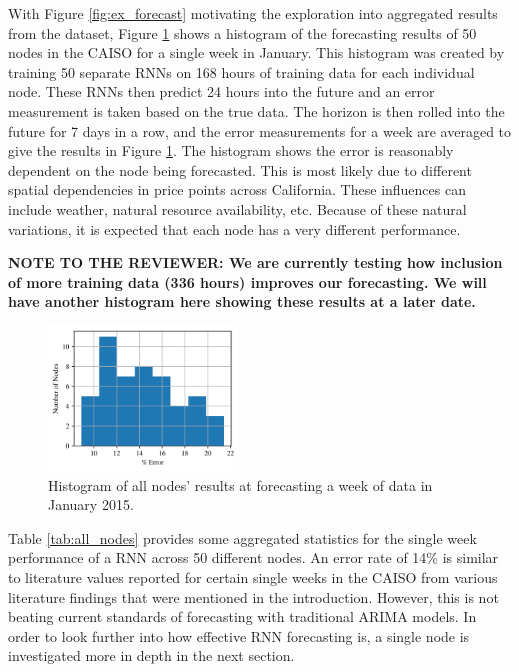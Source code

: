 \documentclass[sigconf]{acmart}
\begin{document}
With Figure \ref{fig:ex_forecast} motivating the exploration into aggregated results from the dataset, Figure \ref{fig:hist_small} shows a histogram of the forecasting results of 50 nodes in the CAISO for a single week in January. This histogram was created by training 50 separate RNNs on 168 hours of training data for each individual node. These RNNs then predict 24 hours into the future and an error measurement is taken based on the true data. The horizon is then rolled into the future for 7 days in a row, and the error measurements for a week are averaged to give the results in Figure \ref{fig:hist_small}. The histogram shows the error is reasonably dependent on the node being forecasted. This is most likely due to different spatial dependencies in price points across California. These influences can include weather, natural resource availability, etc. Because of these natural variations, it is expected that each node has a very different performance. 

\textbf{NOTE TO THE REVIEWER: We are currently testing how inclusion of more training data (336 hours) improves our forecasting. We will have another histogram here showing these results at a later date.}

\begin{figure}[h]
\includegraphics[width=0.45\textwidth]{fig_5.png}
\caption{Histogram of all nodes' results at forecasting a week of data in January 2015.}
\label{fig:hist_small}
\end{figure}



Table \ref{tab:all_nodes} provides some aggregated statistics for the single week performance of a RNN across 50 different nodes. An error rate of 14\% is similar to literature values reported for certain single weeks in the CAISO from various literature findings that were mentioned in the introduction. However, this is not beating current standards of forecasting with traditional ARIMA models. In order to look further into how effective RNN forecasting is, a single node is investigated more in depth in the next section.
\end{document}
